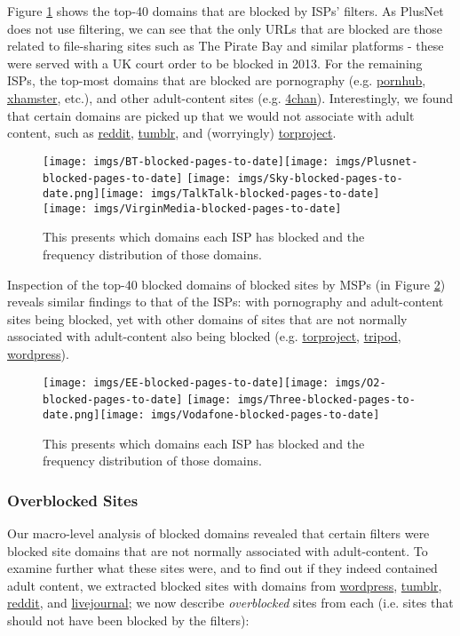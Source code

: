 \documentclass{bmcart}
\begin{document}
Figure \ref{fig:broadband-blocked-domains} shows the top-40 domains that are blocked by ISPs' filters. 
As PlusNet does not use filtering, we can see that the only URLs that are blocked are those related to file-sharing sites such as The Pirate Bay and similar platforms - these were served with a UK court order to be blocked in 2013.
For the remaining ISPs, the top-most domains that are blocked are pornography (e.g. \url{pornhub}, \url{xhamster}, etc.), and other adult-content sites (e.g. \url{4chan}).
Interestingly, we found that certain domains are picked up that we would not associate with adult content, such as \url{reddit}, \url{tumblr}, and (worryingly) \url{torproject}.

\begin{figure}[h!]
\caption{ This presents which domains each ISP has blocked and the frequency distribution of those domains.}
\texttt{[image: imgs/BT-blocked-pages-to-date]}\texttt{[image: imgs/Plusnet-blocked-pages-to-date]}
\texttt{[image: imgs/Sky-blocked-pages-to-date.png]}\texttt{[image: imgs/TalkTalk-blocked-pages-to-date]}
\texttt{[image: imgs/VirginMedia-blocked-pages-to-date]}
\label{fig:broadband-blocked-domains}
\end{figure}

Inspection of the top-40 blocked domains of blocked sites by MSPs (in Figure \ref{fig:mobile-blocked-domains}) reveals similar findings to that of the ISPs: with pornography and adult-content sites being blocked, yet with other domains of sites that are not normally associated with adult-content also being blocked (e.g. \url{torproject}, \url{tripod}, \url{wordpress}).

\begin{figure}[h!]
\caption{ This presents which domains each ISP has blocked and the frequency distribution of those domains.}
\texttt{[image: imgs/EE-blocked-pages-to-date]}\texttt{[image: imgs/O2-blocked-pages-to-date]}
\texttt{[image: imgs/Three-blocked-pages-to-date.png]}\texttt{[image: imgs/Vodafone-blocked-pages-to-date]}
\label{fig:mobile-blocked-domains}
\end{figure}

\subsubsection*{Overblocked Sites}
Our macro-level analysis of blocked domains revealed that certain filters were blocked site domains that are not normally associated with adult-content.
To examine further what these sites were, and to find out if they indeed contained adult content, we extracted blocked sites with domains from \url{wordpress}, \url{tumblr}, \url{reddit}, and \url{livejournal}; we now describe \textit{overblocked} sites from each (i.e. sites that should not have been blocked by the filters):
\end{document}
